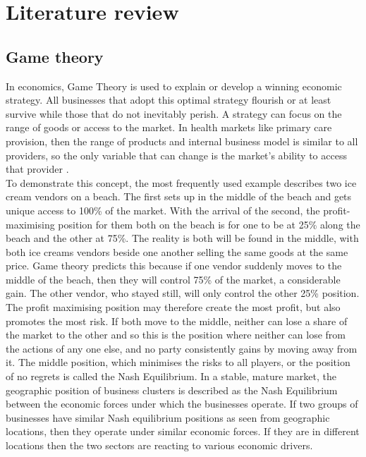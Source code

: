 \documentclass[11pt,a4paper]{article}
\begin{document}
\pagebreak
\section{Literature review}
\subsection{Game theory}
In economics, Game Theory is used to explain or develop a winning economic strategy. All businesses that adopt this optimal strategy flourish or at least survive while those that do not inevitably perish. A strategy can focus on the range of goods or access to the market. In health markets like primary care provision, then the range of products and internal business model is similar to all providers, so the  only variable that can change is the market's ability to access that provider \citep{dinar2008game}. \\

To demonstrate this concept, the most frequently used example describes two ice cream vendors on a beach. The first sets up in the middle of the beach and gets unique access to 100\% of the market. With the arrival of the second, the profit-maximising position for them both on the beach is for one to be at 25\% along the beach and the other at 75\%. The reality is both will be found in the middle, with both ice creams vendors beside one another selling the same goods at the same price. Game theory predicts this because if one vendor suddenly moves to the middle of the beach, then they will control 75\% of the market, a considerable gain. The other vendor, who stayed still, will only control the other 25\% position. The profit maximising position may therefore create the most profit, but also promotes the most risk. If both move to the middle, neither can lose a share of the market to the other and so this is the position where neither can lose from the actions of any one else, and no party consistently gains by moving away from it. The middle position, which minimises the risks to all players, or the position of no regrets is called the Nash Equilibrium. In a stable, mature market, the geographic position of business clusters is described as  the Nash Equilibrium between the economic forces under which the businesses operate. If two groups of businesses have similar Nash equilibrium positions as seen from geographic locations, then they operate under similar economic forces. If they are in different locations then the two sectors are reacting to various economic drivers. \\
\end{document}
